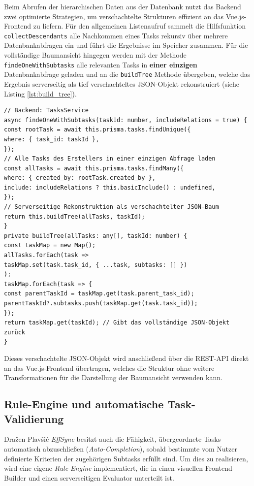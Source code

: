 Beim Abrufen der hierarchischen Daten aus der Datenbank nutzt das Backend zwei optimierte Strategien, um verschachtelte Strukturen effizient an das Vue.js-Frontend zu liefern. Für den allgemeinen Listenaufruf sammelt die Hilfsfunktion \texttt{collectDescendants} alle Nachkommen eines Tasks rekursiv über mehrere Datenbankabfragen ein und führt die Ergebnisse im Speicher zusammen. Für die vollständige Baumansicht hingegen werden mit der Methode \texttt{findeOneWithSubtasks} alle relevanten Tasks in \textbf{einer einzigen} Datenbankabfrage geladen und an die \texttt{buildTree} Methode übergeben, welche das Ergebnis serverseitig als tief verschachteltes JSON-Objekt rekonstruiert (siehe Listing \ref{lst:build_tree}).

\begin{listing}[H]
\begin{verbatim}
// Backend: TasksService
async findeOneWithSubtasks(taskId: number, includeRelations = true) {
const rootTask = await this.prisma.tasks.findUnique({
where: { task_id: taskId },
});
// Alle Tasks des Erstellers in einer einzigen Abfrage laden
const allTasks = await this.prisma.tasks.findMany({
where: { created_by: rootTask.created_by },
include: includeRelations ? this.basicInclude() : undefined,
});
// Serverseitige Rekonstruktion als verschachtelter JSON-Baum
return this.buildTree(allTasks, taskId);
}
private buildTree(allTasks: any[], taskId: number) {
const taskMap = new Map();
allTasks.forEach(task =>
taskMap.set(task.task_id, { ...task, subtasks: [] })
);
taskMap.forEach(task => {
const parentTaskId = taskMap.get(task.parent_task_id);
parentTaskId?.subtasks.push(taskMap.get(task.task_id));
});
return taskMap.get(taskId); // Gibt das vollständige JSON-Objekt zurück
}
\end{verbatim}
\caption{Serverseitige Rekonstruktion des Task-Baums als verschachteltes JSON-Objekt}
\label{lst:build_tree}
\end{listing}

Dieses verschachtelte JSON-Objekt wird anschließend über die \gls{REST-API} direkt an das Vue.js-Frontend übertragen, welches die Struktur ohne weitere Transformationen für die Darstellung der Baumansicht verwenden kann.

\subsection{Rule-Engine und automatische Task-Validierung}{Dražen Plavšić}
\textit{EffSync} besitzt auch die Fähigkeit, übergeordnete Tasks automatisch abzuschließen (\textit{Auto-Completion}), sobald bestimmte vom Nutzer definierte Kriterien der zugehörigen Subtasks erfüllt sind. Um dies zu realisieren, wird eine eigene \textit{Rule-Engine} implementiert, die in einen visuellen Frontend-Builder und einen serverseitigen Evaluator unterteilt ist.

